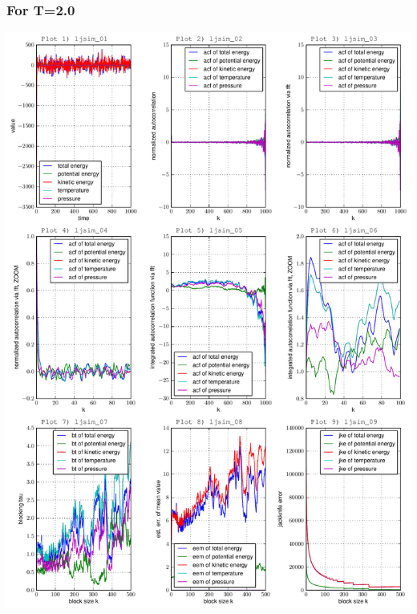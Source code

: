 \documentclass[12pt,a4paper]{scrartcl}
\begin{document}
\subsubsection*{For T=2.0}
\includegraphics[page=1, scale=0.63]{../plots/error20}
\end{document}
